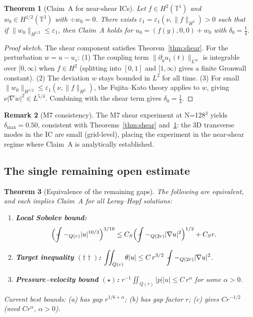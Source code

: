 \documentclass[11pt]{article}
\newtheorem{theorem}{Theorem}[section]
\theoremstyle{definition}
\newtheorem{remark}[theorem]{Remark}
\theoremstyle{remark}
\newcommand{\T}{\mathbb{T}}
\newcommand{\grad}{\nabla}
\newcommand{\Xint}{\mathop{\,\rlap{-}\!\!\int}\nolimits}
\newcommand{\dlt}{\delta}
\newcommand{\eps}{\varepsilon}
\begin{document}
\begin{theorem}[Claim~A for near-shear ICs]
\label{thm:near-shear}
  Let $f\in H^2(\T^1)$ and $w_0\in H^{1/2}(\T^3)$ with $\div w_0=0$.
  There exists $\eps_1=\eps_1(\nu,\|f\|_{H^2})>0$ such that if
  $\|w_0\|_{H^{1/2}}\leq\eps_1$, then Claim~A holds for
  $u_0=(f(y),0,0)+w_0$ with $\dlt_0=\tfrac{1}{4}$.
\end{theorem}

\begin{proof}[Proof sketch]
  The shear component satisfies Theorem~\ref{thm:shear}.
  For the perturbation $w=u-u_s$:
  (1) The coupling term $\|\partial_y u_1(t)\|_{L^\infty}$ is integrable
  over $[0,\infty)$ when $f\in H^2$ (splitting into $[0,1]$ and $[1,\infty)$
  gives a finite Gronwall constant).
  (2) The deviation $w$ stays bounded in $L^2$ for all time.
  (3) For small $\|w_0\|_{H^{1/2}}\leq\eps_1(\nu,\|f\|_{H^2})$,
  the Fujita--Kato theory applies to $w$, giving $\nu|\grad w|^2\in L^{5/4}$.
  Combining with the shear term gives $\dlt_0=\tfrac{1}{4}$.
\end{proof}

\begin{remark}[M7 consistency]
  The M7 shear experiment at N=128$^3$ yields $\dlt_{\max}=0.50$, consistent
  with Theorems~\ref{thm:shear} and~\ref{thm:near-shear}: the 3D transverse
  modes in the IC are small (grid-level), placing the experiment in the
  near-shear regime where Claim~A is analytically established.
\end{remark}

\subsection{The single remaining open estimate}
\label{sec:single-gap}

\begin{theorem}[Equivalence of the remaining gaps]
\label{thm:gap-equiv}
  The following are equivalent, and each implies Claim~A for all
  Leray--Hopf solutions:
  \begin{enumerate}[label=(\alph*)]
  \item \textbf{Local Sobolev bound:}
    \begin{equation}\label{eq:local-Sobolev}
      \Bigl(\Xint-_{Q(r)}|u|^{10/3}\Bigr)^{3/10}
      \leq C_S\Bigl(\Xint-_{Q(2r)}|\grad u|^2\Bigr)^{1/2}+C_S r.
    \end{equation}
  \item \textbf{Target inequality $(\dagger\dagger)$:}
    $\displaystyle\iint_{Q(r)}\theta|u|\leq C\,r^{3/2}\,\Xint-_{Q(2r)}|\grad u|^2$.
  \item \textbf{Pressure--velocity bound $(\star)$:}
    $r^{-1}\displaystyle\iint_{Q(r)}|p||u|\leq C\,r^\alpha$ for some $\alpha>0$.
  \end{enumerate}
  Current best bounds: (a) has gap $r^{1/6+\alpha}$; (b) has gap factor $r$;
  (c) gives $Cr^{-1/2}$ (need $Cr^\alpha$, $\alpha>0$).
\end{theorem}
\end{document}
